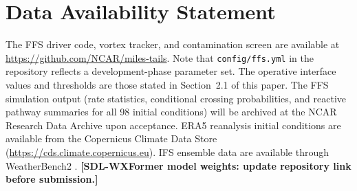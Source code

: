 \documentclass[11pt]{article}
\begin{document}
\section*{Data Availability Statement}
The FFS driver code, vortex tracker, and contamination screen are available at
\url{https://github.com/NCAR/miles-tails}.
Note that \texttt{config/ffs.yml} in the repository reflects a development-phase
parameter set. The operative interface values and thresholds are those stated in
Section~2.1 of this paper.
The FFS simulation output (rate statistics, conditional crossing probabilities, and
reactive pathway summaries for all 98 initial conditions) will be archived at the
NCAR Research Data Archive upon acceptance.
ERA5 reanalysis initial conditions \citep{hersbach2020era5} are available from the
Copernicus Climate Data Store (\url{https://cds.climate.copernicus.eu}).
IFS ensemble data are available through WeatherBench2 \citep{rasp2024weatherbench2}.
\textbf{[SDL-WXFormer model weights: update repository link before submission.]}



\end{document}
